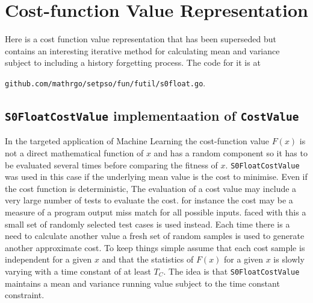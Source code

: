 \documentclass[a4paper,oneside,english]{book}
\numberwithin{equation}{section}
\numberwithin{figure}{section}
\newcommand{\codesorc}[1]{\texttt{github.com/mathrgo/setpso/#1}}
\begin{document}
\section{Cost-function Value Representation} \label{Sec:CostValue} 
Here is a cost function value representation that has been superseded but contains an interesting iterative method for calculating mean and variance subject to including a history forgetting process. The code for it is at 

\codesorc{fun/futil/s0float.go}.
\subsection{\texttt{S0FloatCostValue} implementaation of \texttt{CostValue}}

In the targeted application of Machine Learning the cost-function  value $F(x)$ is not a direct mathematical function of $x$ and has a random component so it has to be evaluated several times before comparing the fitness of $x$. \texttt{S0FloatCostValue}  was used in this case if the underlying mean value is the cost to minimise.  Even if the  cost function is deterministic, The evaluation of a cost value may include a very large number of tests to evaluate  the cost. for instance the cost may be a measure of a program output miss match for all possible inputs. faced with this a small set of randomly selected test cases is used instead. Each time there is a need to calculate another value a fresh set of random samples is used to generate another approximate cost. To keep things simple assume that each cost sample is independent for a given $x$ and that the statistics of $F(x)$ for a given $x$ is slowly varying with a time constant of at least $T_C$. The idea is that  \texttt{S0FloatCostValue}  maintains a mean and variance running value subject to the time constant constraint. 
\end{document}
